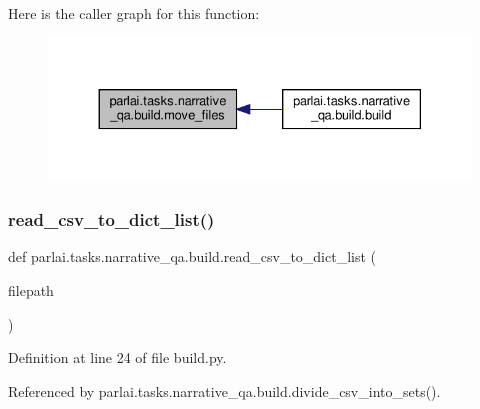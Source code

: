 Here is the caller graph for this function\+:
\nopagebreak
\begin{figure}[H]
\begin{center}
\leavevmode
\includegraphics[width=330pt]{namespaceparlai_1_1tasks_1_1narrative__qa_1_1build_a53e5ef8d085ebdfc1cc6c4918841d097_icgraph}
\end{center}
\end{figure}
\mbox{\label{namespaceparlai_1_1tasks_1_1narrative__qa_1_1build_a7fae633ea705d970c2a6d56b7004f6cd}} 
\subsubsection{\texorpdfstring{read\+\_\+csv\+\_\+to\+\_\+dict\+\_\+list()}{read\_csv\_to\_dict\_list()}}
{\footnotesize\ttfamily def parlai.\+tasks.\+narrative\+\_\+qa.\+build.\+read\+\_\+csv\+\_\+to\+\_\+dict\+\_\+list (\begin{DoxyParamCaption}\item[{}]{filepath }\end{DoxyParamCaption})}



Definition at line 24 of file build.\+py.



Referenced by parlai.\+tasks.\+narrative\+\_\+qa.\+build.\+divide\+\_\+csv\+\_\+into\+\_\+sets().

